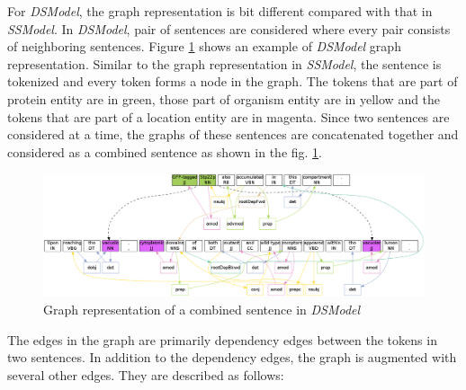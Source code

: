 
For \textit{DSModel}, the graph representation is bit different compared with that in \textit{SSModel}. In \textit{DSModel}, pair of sentences are considered where every pair consists of neighboring sentences. Figure \ref{fig:DSGraph} shows an example of \textit{DSModel} graph representation. Similar to the graph representation in \textit{SSModel}, the sentence is tokenized and every token forms a node in the graph. The tokens that are part of protein entity are in green, those part of organism entity are in yellow and the tokens that are part of a location entity are in magenta. Since two sentences are considered at a time, the graphs of these sentences are concatenated together and considered as a combined sentence as shown in the fig. \ref{fig:DSGraph}. 

\begin{figure}
\centering
\includegraphics[scale=0.3]{figures/DiffSentenceGraph.png}
\caption{Graph representation of a combined sentence in \textit{DSModel}}\label{fig:DSGraph}
\end{figure}


The edges in the graph are primarily dependency edges between the tokens in two sentences. In addition to the dependency edges, the graph is augmented with several other edges. They are described as follows:

